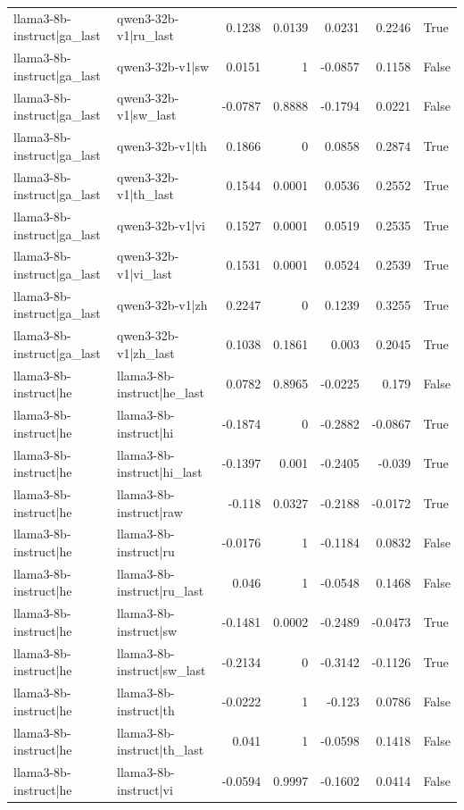 \begin{table}
\begin{tabular}{l l r r r r l}
llama3-8b-instruct|ga_last & qwen3-32b-v1|ru_last & 0.1238 & 0.0139 & 0.0231 & 0.2246 & True \\
llama3-8b-instruct|ga_last & qwen3-32b-v1|sw & 0.0151 & 1 & -0.0857 & 0.1158 & False \\
llama3-8b-instruct|ga_last & qwen3-32b-v1|sw_last & -0.0787 & 0.8888 & -0.1794 & 0.0221 & False \\
llama3-8b-instruct|ga_last & qwen3-32b-v1|th & 0.1866 & 0 & 0.0858 & 0.2874 & True \\
llama3-8b-instruct|ga_last & qwen3-32b-v1|th_last & 0.1544 & 0.0001 & 0.0536 & 0.2552 & True \\
llama3-8b-instruct|ga_last & qwen3-32b-v1|vi & 0.1527 & 0.0001 & 0.0519 & 0.2535 & True \\
llama3-8b-instruct|ga_last & qwen3-32b-v1|vi_last & 0.1531 & 0.0001 & 0.0524 & 0.2539 & True \\
llama3-8b-instruct|ga_last & qwen3-32b-v1|zh & 0.2247 & 0 & 0.1239 & 0.3255 & True \\
llama3-8b-instruct|ga_last & qwen3-32b-v1|zh_last & 0.1038 & 0.1861 & 0.003 & 0.2045 & True \\
llama3-8b-instruct|he & llama3-8b-instruct|he_last & 0.0782 & 0.8965 & -0.0225 & 0.179 & False \\
llama3-8b-instruct|he & llama3-8b-instruct|hi & -0.1874 & 0 & -0.2882 & -0.0867 & True \\
llama3-8b-instruct|he & llama3-8b-instruct|hi_last & -0.1397 & 0.001 & -0.2405 & -0.039 & True \\
llama3-8b-instruct|he & llama3-8b-instruct|raw & -0.118 & 0.0327 & -0.2188 & -0.0172 & True \\
llama3-8b-instruct|he & llama3-8b-instruct|ru & -0.0176 & 1 & -0.1184 & 0.0832 & False \\
llama3-8b-instruct|he & llama3-8b-instruct|ru_last & 0.046 & 1 & -0.0548 & 0.1468 & False \\
llama3-8b-instruct|he & llama3-8b-instruct|sw & -0.1481 & 0.0002 & -0.2489 & -0.0473 & True \\
llama3-8b-instruct|he & llama3-8b-instruct|sw_last & -0.2134 & 0 & -0.3142 & -0.1126 & True \\
llama3-8b-instruct|he & llama3-8b-instruct|th & -0.0222 & 1 & -0.123 & 0.0786 & False \\
llama3-8b-instruct|he & llama3-8b-instruct|th_last & 0.041 & 1 & -0.0598 & 0.1418 & False \\
llama3-8b-instruct|he & llama3-8b-instruct|vi & -0.0594 & 0.9997 & -0.1602 & 0.0414 & False \\

\end{tabular}
\end{table}
